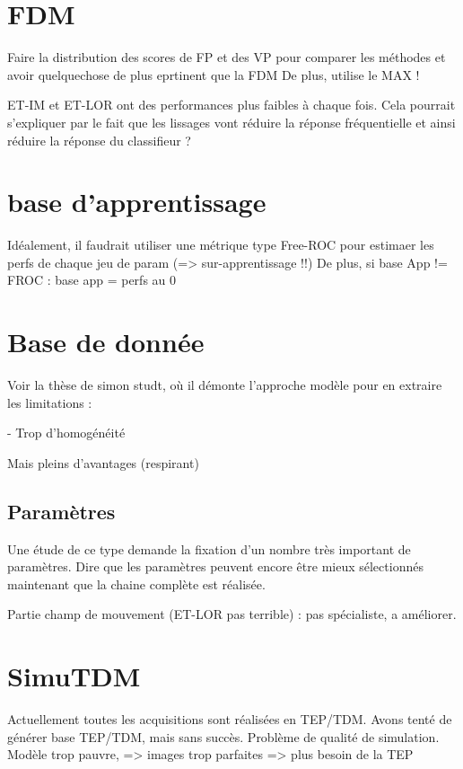 \section{FDM}

Faire la distribution des scores de FP et des VP pour comparer les méthodes et avoir quelquechose de plus eprtinent que la FDM
De plus, utilise le MAX !

ET-IM et ET-LOR ont des performances plus faibles à chaque fois. Cela pourrait s'expliquer par le fait que les lissages vont réduire la réponse fréquentielle et ainsi réduire la réponse du classifieur ?

\section{base d'apprentissage}

Idéalement, il faudrait utiliser une métrique type Free-ROC pour estimaer les perfs de chaque jeu de param (=> sur-apprentissage !!)
De plus, si base App != FROC : base app = perfs au 0

\section{Base de donnée}

Voir la thèse de simon studt, où il démonte l'approche modèle pour en extraire les limitations :

- Trop d'homogénéité

Mais pleins d'avantages (respirant)

\subsection{Paramètres}

Une étude de ce type demande  la fixation d'un nombre très important de paramètres. 
Dire que les paramètres peuvent encore être mieux sélectionnés maintenant que la chaine complète est réalisée.

Partie champ de mouvement (ET-LOR pas terrible) : pas spécialiste, a améliorer.


\section{SimuTDM}

Actuellement toutes les acquisitions sont réalisées en TEP/TDM. Avons tenté de générer base TEP/TDM, mais sans succès. Problème de qualité de simulation. Modèle trop pauvre, => images trop parfaites => plus besoin de la TEP

